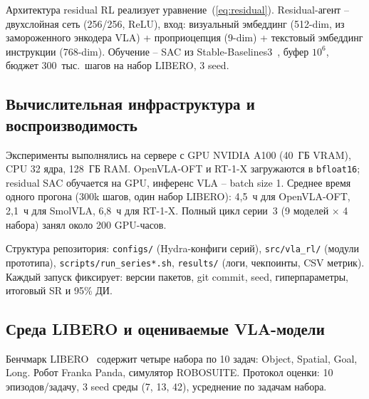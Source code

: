     Архитектура residual RL реализует уравнение~(\ref{eq:residual}). Residual-агент -- двухслойная сеть (256/256, ReLU), вход: визуальный эмбеддинг (512-dim, из замороженного энкодера VLA) + проприоцепция (9-dim) + текстовый эмбеддинг инструкции (768-dim). Обучение -- SAC из Stable-Baselines3~\cite{stable_baselines3}, буфер $10^6$, бюджет 300~тыс.\ шагов на набор LIBERO, 3 seed.

\subsection{Вычислительная инфраструктура и воспроизводимость}
\label{subsec:infra}

    Эксперименты выполнялись на сервере с GPU NVIDIA A100 (40~ГБ VRAM), CPU 32 ядра, 128~ГБ RAM. OpenVLA-OFT и RT-1-X загружаются в \texttt{bfloat16}; residual SAC обучается на GPU, инференс VLA -- batch size 1. Среднее время одного прогона (300k шагов, один набор LIBERO): 4,5~ч для OpenVLA-OFT, 2,1~ч для SmolVLA, 6,8~ч для RT-1-X. Полный цикл серии~3 (9 моделей $\times$ 4 набора) занял около 200 GPU-часов.

    Структура репозитория: \texttt{configs/} (Hydra-конфиги серий), \texttt{src/vla\_rl/} (модули прототипа), \texttt{scripts/run\_series*.sh}, \texttt{results/} (логи, чекпоинты, CSV метрик). Каждый запуск фиксирует: версии пакетов, git commit, seed, гиперпараметры, итоговый SR и 95\% ДИ.

\subsection{Среда LIBERO и оцениваемые VLA-модели}
\label{subsec:libero}

    Бенчмарк LIBERO~\cite{liu2023libero} содержит четыре набора по 10 задач: Object, Spatial, Goal, Long. Робот Franka Panda, симулятор ROBOSUITE. Протокол оценки: 10 эпизодов/задачу, 3 seed среды (7, 13, 42), усреднение по задачам набора.

